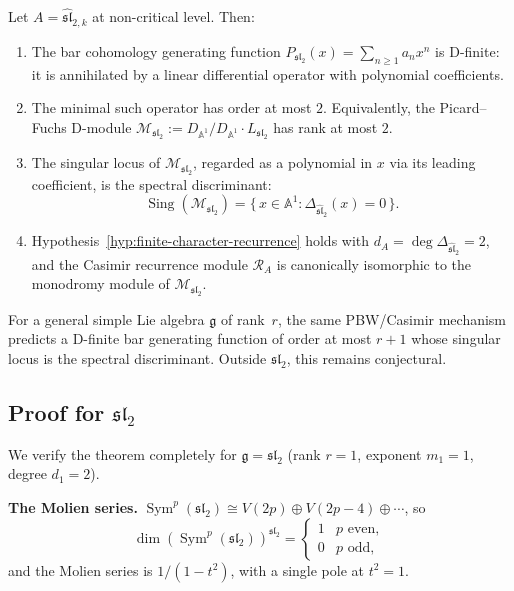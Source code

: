 \begin{theorem}
\label{thm:pbw-recurrence}
Let \(A=\widehat{\mathfrak{sl}}_{2,k}\) at non-critical level.
Then:
\begin{enumerate}[label=\textup{(\alph*)}]
\item
The bar cohomology generating function
\(P_{\mathfrak{sl}_2}(x)=\sum_{n\ge 1}a_n x^n\)
is D-finite: it is annihilated by a linear differential
operator with polynomial coefficients.
\item
The minimal such operator has order at most \(2\).
Equivalently, the Picard--Fuchs D-module
\(\mathcal M_{\mathfrak{sl}_2}:=D_{\mathbb A^1}/D_{\mathbb A^1}
\cdot L_{\mathfrak{sl}_2}\) has rank at most \(2\).
\item
The singular locus of \(\mathcal M_{\mathfrak{sl}_2}\),
regarded as a polynomial in \(x\) via its leading coefficient,
is the spectral discriminant:
\[
\operatorname{Sing}(\mathcal M_{\mathfrak{sl}_2})
=\{\,x\in\mathbb A^1:\Delta_{\widehat{\mathfrak{sl}}_2}(x)=0\,\}.
\]
\item
Hypothesis~\ref{hyp:finite-character-recurrence} holds with
\(d_A=\deg\Delta_{\widehat{\mathfrak{sl}}_2}=2\), and the
Casimir recurrence module \(\mathcal R_A\) is canonically
isomorphic to the monodromy module of
\(\mathcal M_{\mathfrak{sl}_2}\).
\end{enumerate}
\end{theorem}

\begin{remark}
For a general simple Lie algebra \(\mathfrak g\) of rank~\(r\), the
same PBW/Casimir mechanism predicts a D-finite bar generating function
of order at most \(r+1\) whose singular locus is the spectral
discriminant.  Outside \(\mathfrak{sl}_2\), this remains conjectural.
\end{remark}

\subsection{Proof for \texorpdfstring{$\mathfrak{sl}_2$}{sl(2)}}
\label{subsec:pbw-recurrence-sl2}

We verify the theorem completely for \(\mathfrak g=\mathfrak{sl}_2\)
(rank \(r=1\), exponent \(m_1=1\), degree \(d_1=2\)).

\medskip\noindent
\textbf{The Molien series.}
\(\operatorname{Sym}^p(\mathfrak{sl}_2)\cong
V(2p)\oplus V(2p-4)\oplus\cdots\),
so
\[
\dim(\operatorname{Sym}^p(\mathfrak{sl}_2))^{\mathfrak{sl}_2}
=\begin{cases}1&p\text{ even},\\0&p\text{ odd},\end{cases}
\]
and the Molien series is \(1/(1-t^2)\), with a single pole at
\(t^2=1\).

